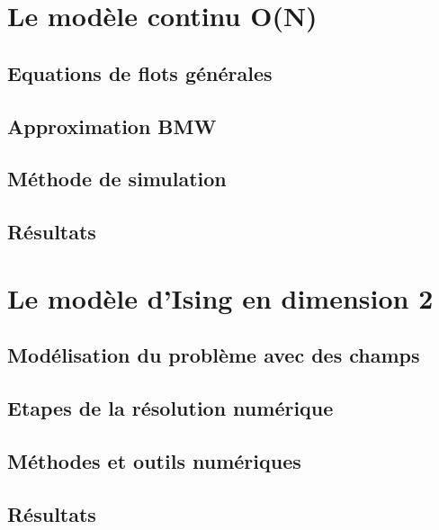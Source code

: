 \documentclass[10pt]{article}
\begin{document}
\begin{multicols}{2}
\pagebreak

\section{Le modèle continu O(N)}
\subsection{Equations de flots générales}
\lipsum[1]
\vspace*{11pt}
\subsection{Approximation BMW}
\lipsum[1]
\vspace*{11pt}
\subsection{Méthode de simulation}
\lipsum[1]
\vspace*{11pt}
\subsection{Résultats}
\lipsum[1]


\pagebreak
\section{Le modèle d'Ising en dimension 2}
\subsection{Modélisation du problème avec des champs}
\lipsum[1]
\vspace*{11pt}
\subsection{Etapes de la résolution numérique}
\lipsum[1]
\vspace*{11pt}
\subsection{Méthodes et outils numériques}
\lipsum[1]
\vspace*{11pt}
\subsection{Résultats} 
\lipsum[1]







\end{multicols}
\end{document}
